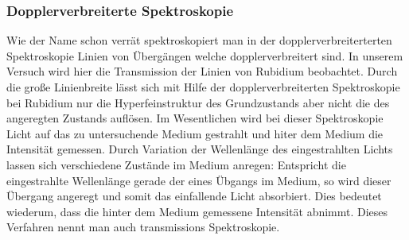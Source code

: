 \documentclass[12pt]{article}
\begin{document}
\subsubsection{Dopplerverbreiterte Spektroskopie}
Wie der Name schon verrät spektroskopiert man in der dopplerverbreiterterten Spektroskopie Linien von Übergängen welche
dopplerverbreitert sind. In unserem Versuch wird hier die Transmission der Linien von Rubidium beobachtet. Durch die große
Linienbreite lässt sich mit Hilfe der dopplerverbreiterten Spektroskopie bei Rubidium nur die Hyperfeinstruktur des Grundzustands aber nicht die
des angeregten Zustands auflösen. Im Wesentlichen wird bei dieser Spektroskopie Licht auf das zu untersuchende Medium gestrahlt und hiter dem Medium die Intensität gemessen. Durch Variation der Wellenlänge des eingestrahlten Lichts lassen sich verschiedene Zustände im Medium anregen: Entspricht die eingestrahlte Wellenlänge gerade der eines Übgangs im Medium, so wird dieser Übergang angeregt und somit das einfallende Licht absorbiert. Dies bedeutet wiederum, dass die hinter dem Medium gemessene Intensität abnimmt. Dieses Verfahren nennt man auch transmissions Spektroskopie.
\end{document}
